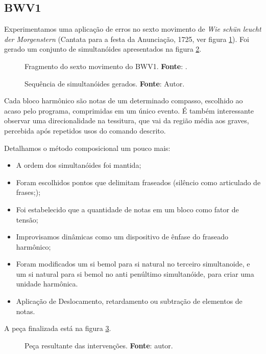 \subsection{BWV1}\label{sec:bwv1}

Experimentamos uma aplicação de erros no sexto movimento de \emph{Wie schün leucht der Morgenstern} (Cantata para a festa da Anunciação, 1725, ver figura \ref{fig:bwv1_frag}). Foi gerado um conjunto de simultanóides apresentados na figura \ref{fig:bwv1_extract}.

\begin{figure}[h]
  \centering
  
  \caption{Fragmento do sexto movimento do BWV1. \textbf{Fonte}: \cite{music21_2015}.}
  \label{fig:bwv1_frag}
\end{figure}

\begin{figure}[h]
  \centering
  
  \caption{Sequência de simultanóides gerados. \textbf{Fonte}: Autor.}
  \label{fig:bwv1_extract}
\end{figure}

 Cada bloco harmônico são notas de um determinado compasso, escolhido ao acaso pelo programa, comprimidas em um único evento. É também  interessante observar uma direcionalidade na tessitura, que vai da região média aos graves, percebida após repetidos usos do comando descrito. 

Detalhamos o método composicional um pouco mais: \begin{itemize}
\item A ordem dos simultanóides foi mantida;
\item Foram escolhidos pontos que delimitam fraseados (silêncio como articulado de frases;);
\item Foi estabelecido que a quantidade de notas em um bloco como fator de tensão;
\item Improvisamos dinâmicas como um dispositivo de ênfase do fraseado harmônico; 
\item Foram modificados um si bemol para si natural no terceiro simultanoide, e um si natural para si bemol no anti penúltimo simultanóide, para criar uma unidade harmônica. 
\item Aplicação de Deslocamento, retardamento ou subtração de elementos de notas.
\end{itemize}

A peça finalizada está na figura \ref{fig:bwv1}.

 \begin{figure}
  \centering
  
  \caption{Peça resultante das intervenções. \textbf{Fonte}: autor.}
  \label{fig:bwv1}
\end{figure}

